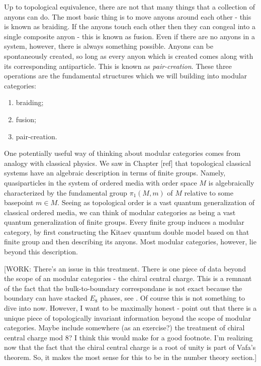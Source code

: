 Up to topological equivalence, there are not that many things that a collection of anyons can do. The most basic thing is to move anyons around each other - this is known as braiding. If the anyons touch each other then they can congeal into a single composite anyon - this is known as fusion. Even if there are no anyons in a system, however, there is always something possible. Anyons can be spontaneously created, so long as every anyon which is created comes along with its corresponding antiparticle. This is known as \textit{pair-creation}. These three operations are the fundamental structures which we will building into modular categories:

\begin{enumerate}
\item braiding;
\item fusion;
\item pair-creation.
\end{enumerate}

One potentially useful way of thinking about modular categories comes from analogy with classical physics. We saw in Chapter [ref] that topological classical systems have an algebraic description in terms of finite groups. Namely, quasiparticles in the system of ordered media with order space $M$ is algebraically characterized by the fundamental group $\pi_1(M,m)$ of $M$ relative to some basepoint $m\in M$. Seeing as topological order is a vast quantum generalization of classical ordered media, we can think of modular categories as being a vast quantum generalization of finite groups. Every finite group induces a modular category, by first constructing the Kitaev quantum double model based on that finite group and then describing its anyons. Most modular categories, however, lie beyond this description.

[WORK: There's an issue in this treatment. There is one piece of data beyond the scope of an modular categories - the chiral central charge. This is a remnant of the fact that the bulk-to-boundary correspondane is not exact because the boundary can have stacked $E_8$ phases, see \cite{bonderson2021measuring}. Of course this is not something to dive into now. However, I want to be maximally honest - point out that there is a unique piece of topologically invariant information beyond the scope of modular categories. Maybe include somewhere (as an exercise?) the treatment of chiral central charge mod 8? I think this would make for a good footnote. I'm realizing now that the fact that the chiral central charge is a root of unity is part of Vafa's theorem. So, it makes the most sense for this to be in the number theory section.] 

